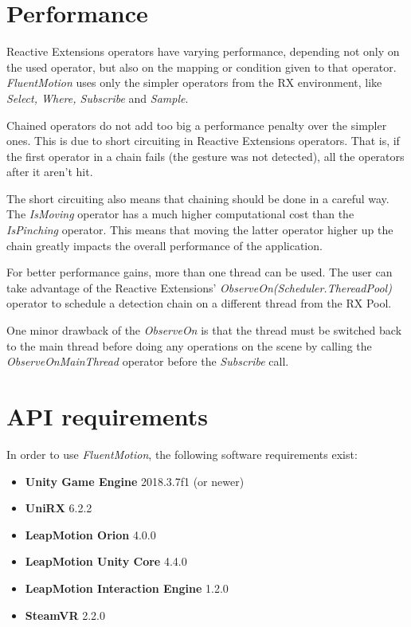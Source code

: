 \documentclass[chi_draft]{sigchi}
\def\fluentmotion{\textit{FluentMotion}}
\def\rx{Reactive Extensions}
\begin{document}
\section{Performance}

\rx{} operators have varying performance, depending not only on the used operator, but also on the mapping or condition given to that operator. \fluentmotion{} uses only the simpler operators from the RX environment, like \textit{Select, Where, Subscribe} and \textit{Sample}.


Chained operators do not add too big a performance penalty over the simpler ones. This is due to short circuiting in \rx{} operators. That is, if the first operator in a chain fails (the gesture was not detected), all the operators after it aren't hit.


The short circuiting also means that chaining should be done in a careful way. The \textit{IsMoving} operator has a much higher computational cost than the \textit{IsPinching} operator. This means that moving the latter operator higher up the chain greatly impacts the overall performance of the application.


For better performance gains, more than one thread can be used. The user can take advantage of the \rx{}' \textit{ObserveOn(Scheduler.ThereadPool)} operator to schedule a detection chain on a different thread from the RX Pool. 

One minor drawback of the \textit{ObserveOn} is that the thread must be switched back to the main thread before doing any operations on the scene by calling the \textit{ObserveOnMainThread} operator before the \textit{Subscribe} call.

\section{API requirements}

In order to use \fluentmotion{}, the following software requirements exist:

\begin{itemize}
  \item \textbf{Unity Game Engine} 2018.3.7f1 (or newer)
  \item \textbf{UniRX} 6.2.2
  \item \textbf{LeapMotion Orion} 4.0.0
  \item \textbf{LeapMotion Unity Core} 4.4.0
  \item \textbf{LeapMotion Interaction Engine} 1.2.0
  \item \textbf{SteamVR} 2.2.0 
\end{itemize}
\end{document}
